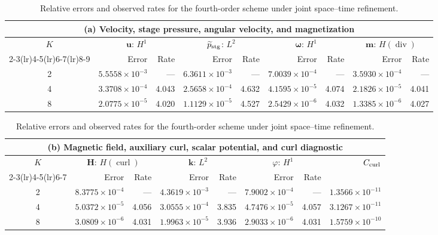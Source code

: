 \documentclass[11pt,a4paper]{article}
\newcommand{\bs}{\boldsymbol}
\DeclareMathOperator{\curl}{curl}
\DeclareMathOperator{\ddiv}{div}
\newcommand{\Div}{\ddiv}
\newcommand{\pp}{\widetilde p}
\theoremstyle{definition}
\numberwithin{equation}{section}
\begin{document}
\begin{table}[H]
\centering
\caption{Relative errors and observed rates for the fourth-order scheme under joint space--time refinement.}
\label{tab:fourth-order-errors}
\begingroup
\small
\setlength{\tabcolsep}{3.5pt}
\renewcommand{\arraystretch}{1.10}
\begin{tabular}{@{}c*{8}{r}@{}}
\toprule
\multicolumn{9}{c}{(a) Velocity, stage pressure, angular velocity, and magnetization}\\
\midrule
$K$ & \multicolumn{2}{c}{$\bs u$: $H^1$} & \multicolumn{2}{c}{$\pp_{\rm stg}$: $L^2$} & \multicolumn{2}{c}{$\bs\omega$: $H^1$} & \multicolumn{2}{c}{$\bs m$: $H(\Div)$}\\
\cmidrule(lr){2-3}\cmidrule(lr){4-5}\cmidrule(lr){6-7}\cmidrule(lr){8-9}
 & Error & Rate & Error & Rate & Error & Rate & Error & Rate\\
\midrule
2 & $5.5558\!\times\!10^{-3}$ & --- & $6.3611\!\times\!10^{-3}$ & --- & $7.0039\!\times\!10^{-4}$ & --- & $3.5930\!\times\!10^{-4}$ & ---\\
4 & $3.3708\!\times\!10^{-4}$ & 4.043 & $2.5658\!\times\!10^{-4}$ & 4.632 & $4.1595\!\times\!10^{-5}$ & 4.074 & $2.1826\!\times\!10^{-5}$ & 4.041\\
8 & $2.0775\!\times\!10^{-5}$ & 4.020 & $1.1129\!\times\!10^{-5}$ & 4.527 & $2.5429\!\times\!10^{-6}$ & 4.032 & $1.3385\!\times\!10^{-6}$ & 4.027\\
\bottomrule
\end{tabular}
\par\medskip
\begin{tabular}{@{}c*{7}{r}@{}}
\toprule
\multicolumn{8}{c}{(b) Magnetic field, auxiliary curl, scalar potential, and curl diagnostic}\\
\midrule
$K$ & \multicolumn{2}{c}{$\bs H$: $H(\curl)$} & \multicolumn{2}{c}{$\bs k$: $L^2$} & \multicolumn{2}{c}{$\varphi$: $H^1$} & $C_{\rm curl}$\\
\cmidrule(lr){2-3}\cmidrule(lr){4-5}\cmidrule(lr){6-7}
 & Error & Rate & Error & Rate & Error & Rate & \\
\midrule
2 & $8.3775\!\times\!10^{-4}$ & --- & $4.3619\!\times\!10^{-3}$ & --- & $7.9002\!\times\!10^{-4}$ & --- & $1.3566\!\times\!10^{-11}$\\
4 & $5.0372\!\times\!10^{-5}$ & 4.056 & $3.0555\!\times\!10^{-4}$ & 3.835 & $4.7476\!\times\!10^{-5}$ & 4.057 & $3.1267\!\times\!10^{-11}$\\
8 & $3.0809\!\times\!10^{-6}$ & 4.031 & $1.9963\!\times\!10^{-5}$ & 3.936 & $2.9033\!\times\!10^{-6}$ & 4.031 & $1.5759\!\times\!10^{-10}$\\
\bottomrule
\end{tabular}
\endgroup
\end{table}
\end{document}
